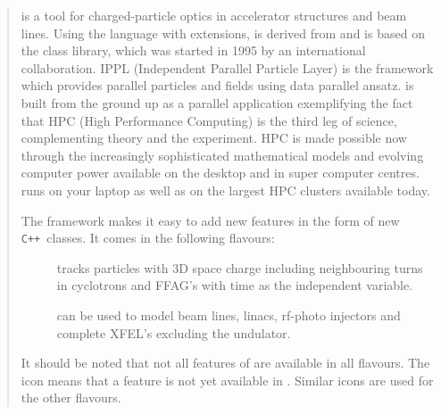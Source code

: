 \documentclass[a4paper]{book}
\begin{document}
\begin{titlepage}
\begin{quotation}
\opal is a tool for charged-particle optics in
accelerator structures and beam lines.
Using the \mad language with extensions, \opal is derived from \madninep and is based
on the \classic class library,
which was started in 1995 by an international collaboration. IPPL (Independent Parallel Particle Layer) is
the framework which provides parallel particles and fields using data parallel ansatz.
\opal is built from the ground up as a parallel application exemplifying the fact that HPC (High Performance Computing)
is the third leg of science, complementing theory and the experiment.
HPC is made possible now through the increasingly sophisticated mathematical models and evolving computer power available on the desktop
and in super computer centres. \opal runs on your laptop as well as on the largest HPC clusters available today.

The \opal framework makes it easy to add new features in the form of new
\texttt{C++}~classes. It comes in the following flavours:
\begin{description}
\item[\opalcycl] tracks particles with 3D space charge including neighbouring turns in cyclotrons and FFAG's
with time as the independent variable.
\item[\opalt] can be used to model beam lines, linacs, rf-photo injectors and complete XFEL's excluding the undulator.

\end{description}
It should be noted that not all features of \opal are available in all flavours. The icon \noopalt means that a feature is not yet
available in \opalt. Similar icons are used for the other flavours.



\end{quotation}
\vfill
\end{titlepage}
\thispagestyle{empty}
\end{document}
